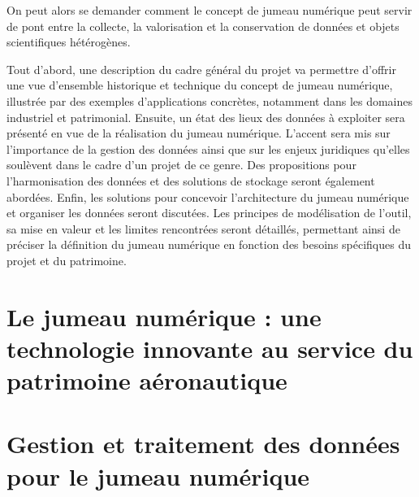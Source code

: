 \documentclass[a4paper,12pt,twoside]{book}
\newcommand{\clearemptydoublepage}{\newpage{\pagestyle{empty}\cleardoublepage}}
\begin{document}
On peut alors se demander comment le concept de jumeau numérique peut servir de pont entre la collecte, la valorisation et la conservation de données et objets scientifiques hétérogènes.

Tout d'abord, une description du cadre général du projet va permettre d'offrir une vue d’ensemble historique et technique du concept de jumeau numérique, illustrée par des exemples d’applications concrètes, notamment dans les domaines industriel et patrimonial. Ensuite, un état des lieux des données à exploiter sera présenté en vue de la réalisation du jumeau numérique. L’accent sera mis sur l’importance de la gestion des données ainsi que sur les enjeux juridiques qu'elles soulèvent dans le cadre d'un projet de ce genre. Des propositions pour l’harmonisation des données et des solutions de stockage seront également abordées. Enfin, les solutions pour concevoir l’architecture du jumeau numérique et organiser les données seront discutées. Les principes de modélisation de l’outil, sa mise en valeur et les limites rencontrées seront détaillés, permettant ainsi de préciser la définition du jumeau numérique en fonction des besoins spécifiques du projet et du patrimoine.

\clearemptydoublepage

\mainmatter

\part{Le jumeau numérique : une technologie innovante au service du patrimoine aéronautique}
    
    
     \clearemptydoublepage
     
     
    
     \clearemptydoublepage
     
    
            
    \clearemptydoublepage


\part{Gestion et traitement des données pour le jumeau numérique}
    
    
    \clearemptydoublepage
     
    
            
\end{document}
